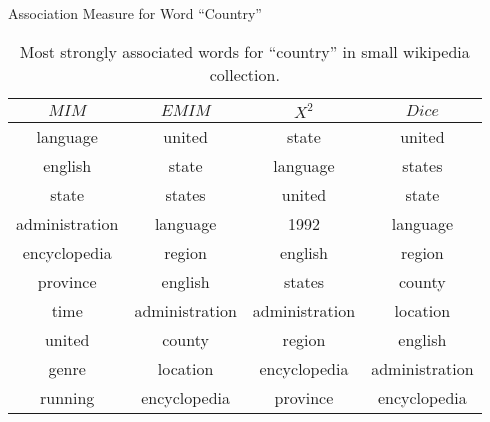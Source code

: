 \begin{table}[!htbp]
	\caption{Association Measure for Word ``Country''} \label{tab:country}
	\begin{center}
	\vspace{-5mm}
		\begin{tabular}{ c | c | c | c }
			\toprule
			$MIM$ & $EMIM$ & $X^2$ & $Dice$\\
			\midrule
language  &      united       &   state     &      united         \\
english   &      state        &   language  &      states         \\
state     &      states       &   united    &      state          \\
administration & language     &   1992      &      language       \\
encyclopedia   & region       &   english   &      region         \\
province       & english      &   states    &      county         \\
time           & administration & administration & location       \\
united         & county         & region        &  english        \\
genre          & location       & encyclopedia  &  administration \\
running        & encyclopedia   & province      &  encyclopedia\\
			\bottomrule
		\end{tabular}
	\caption*{\scriptsize Most strongly associated words for ``country'' in small wikipedia collection.}
	 \end{center}
\end{table}


